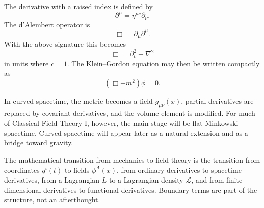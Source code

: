 The derivative with a raised index is defined by
\[
    \partial^\mu = \eta^{\mu\nu}\partial_\nu.
\]
The d'Alembert operator is
\[
    \Box = \partial_\mu\partial^\mu.
\]
With the above signature this becomes
\[
    \Box = \partial_t^2 - \nabla^2
\]
in units where \(c=1\). The Klein--Gordon equation may then be written compactly
as
\[
    (\Box + m^2)\phi=0.
\]

In curved spacetime, the metric becomes a field \(g_{\mu\nu}(x)\), partial
derivatives are replaced by covariant derivatives, and the volume element is
modified. For much of Classical Field Theory I, however, the main stage will be
flat Minkowski spacetime. Curved spacetime will appear later as a natural
extension and as a bridge toward gravity.

\begin{summarybox}
The mathematical transition from mechanics to field theory is the transition
from coordinates \(q^i(t)\) to fields \(\phi^A(x)\), from ordinary derivatives to
spacetime derivatives, from a Lagrangian \(L\) to a Lagrangian density
\(\mathcal{L}\), and from finite-dimensional derivatives to functional
derivatives. Boundary terms are part of the structure, not an afterthought.
\end{summarybox}
